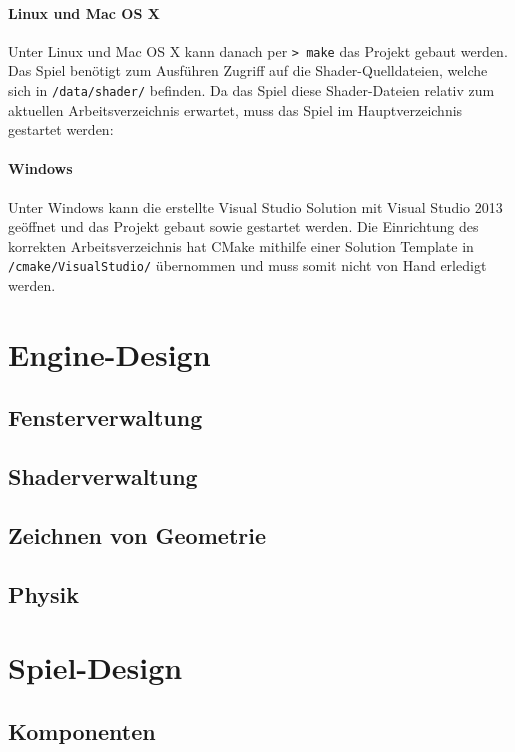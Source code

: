 \documentclass[12pt, a4paper, titlepage, hidelinks]{scrreprt}
\begin{document}
\paragraph{Linux und Mac OS X}
Unter Linux und Mac OS X kann danach per \texttt{>~make} das Projekt gebaut werden. Das Spiel benötigt zum Ausführen Zugriff auf die Shader-Quelldateien, welche sich in \texttt{/data/shader/} befinden. Da das Spiel diese Shader-Dateien relativ zum aktuellen Arbeitsverzeichnis erwartet, muss das Spiel im Hauptverzeichnis gestartet werden:

\paragraph{Windows}
Unter Windows kann die erstellte Visual Studio Solution mit Visual Studio 2013 geöffnet und das Projekt gebaut sowie gestartet werden. Die Einrichtung des korrekten Arbeitsverzeichnis hat CMake mithilfe einer Solution Template in \texttt{/cmake/VisualStudio/} übernommen und muss somit nicht von Hand erledigt werden.

\section{Engine-Design}
\subsection{Fensterverwaltung}
\subsection{Shaderverwaltung}
\subsection{Zeichnen von Geometrie}
\subsection{Physik}



\section{Spiel-Design}
\subsection{Komponenten}
\end{document}
